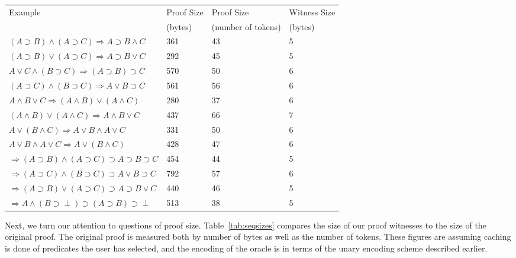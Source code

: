 \documentclass{llncs}
\begin{document}
\begin{table*}[htbp]
\begin{center}
\begin{small}
\begin{tabular}{|l|l|l|l|}
\hline
Example & Proof Size & Proof Size & Witness Size \\
& (bytes) & (number of tokens) & (bytes)\\
\hline
$(A\supset B)\wedge (A\supset C)\Rightarrow A\supset B\wedge C$
&       361 
&       43 
&       5 \\
$(A\supset B)\vee (A\supset C)\Rightarrow A\supset B\vee C$
&       292 
&       45 
&       5 \\
$A\vee C\wedge (B\supset C)\Rightarrow (A\supset B)\supset C$
&       570 
&       50 
&       6 \\
$(A\supset C)\wedge (B\supset C)\Rightarrow A\vee B\supset C$
&       561 
&       56 
&       6 \\
$A\wedge B\vee C\Rightarrow (A\wedge B)\vee (A\wedge C)$
&       280 
&       37 
&       6 \\
$(A\wedge B)\vee (A\wedge C)\Rightarrow A\wedge B\vee C$
&       437 
&       66 
&       7 \\
$A\vee (B\wedge C)\Rightarrow A\vee B\wedge A\vee C$
&       331 
&       50 
&       6 \\
$A\vee B\wedge A\vee C\Rightarrow A\vee (B\wedge C)$
&       428 
&       47 
&       6 \\
$\Rightarrow (A\supset B)\wedge (A\supset C)\supset A\supset B\supset C$
&       454 
&       44 
&       5 \\
$\Rightarrow (A\supset C)\wedge (B\supset C)\supset A\vee B\supset C$
&       792 
&       57 
&       6 \\
$\Rightarrow (A\supset B)\vee (A\supset C)\supset A\supset B\vee C$
&       440 
&       46 
&       5 \\
$\Rightarrow A\wedge (B\supset \perp)\supset (A\supset B)\supset \perp$ 
&       513 
&       38 
&       5 \\
\hline
\end{tabular}
\end{small}
\end{center}
\caption{\label{tab:seqsizes}
Sequent Calculus: Sizes with Caching of User-Selected Predicates}
\end{table*}


Next, we turn our attention to questions of proof size. 
Table~\ref{tab:seqsizes} compares the size of our proof witnesses to the
size of the original proof. The original proof is measured both by number 
of bytes as well as the number of tokens. These figures are assuming 
caching is done of predicates the user has selected, and the encoding of
the oracle is in terms of the unary encoding scheme described earlier.
\end{document}
